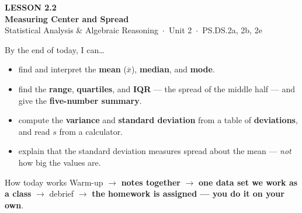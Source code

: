 \documentclass[aspectratio=169, 11pt]{beamer}
\begin{document}
{
\begin{frame}[plain]
  \vspace{2.8cm}\hspace{0.55cm}%
  \begin{minipage}{0.9\textwidth}
    {\color{goldacc}\bfseries\small LESSON 2.2}\\[0.5cm]
    {\color{white}\bfseries\LARGE Measuring Center and Spread}\\[1.2cm]
    {\color{frostmid}\small Statistical Analysis \& Algebraic Reasoning~$\cdot$~Unit 2~$\cdot$~PS.DS.2a, 2b, 2e}
  \end{minipage}
\end{frame}
}

\begin{frame}[t, plain]
  By the end of today, I can\ldots
  \begin{itemize}\setlength{\itemsep}{4pt}
    \item find and interpret the \textbf{mean} ($\bar{x}$), \textbf{median}, and \textbf{mode}.
    \item find the \textbf{range}, \textbf{quartiles}, and \textbf{IQR} --- the spread of the
          middle half --- and give the \textbf{five-number summary}.
    \item compute the \textbf{variance} and \textbf{standard deviation} from a table of
          \textbf{deviations}, and read $s$ from a calculator.
    \item explain that the standard deviation measures spread about the mean --- \emph{not} how
          big the values are.
  \end{itemize}
  \begin{block}{How today works}
    Warm-up $\to$ \textbf{notes together} $\to$ \textbf{one data set we work as a class} $\to$
    debrief $\to$ \textbf{the homework is assigned --- you do it on your own}.
  \end{block}
\end{frame}
\end{document}
